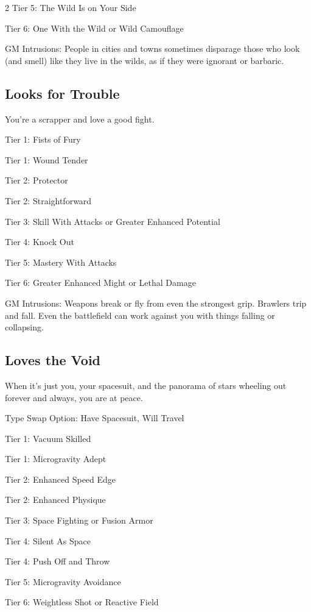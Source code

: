 \begin{multicols}{2}
Tier 5: The Wild Is on Your Side

Tier 6: One With the Wild or Wild Camouflage

GM Intrusions: People in cities and towns sometimes disparage those who look (and smell) like they live in the wilds, as if they were ignorant or barbaric.

\subsection{Looks for Trouble}

You’re a scrapper and love a good fight.

Tier 1: Fists of Fury

Tier 1: Wound Tender

Tier 2: Protector

Tier 2: Straightforward

Tier 3: Skill With Attacks or Greater Enhanced Potential

Tier 4: Knock Out

Tier 5: Mastery With Attacks

Tier 6: Greater Enhanced Might or Lethal Damage

GM Intrusions: Weapons break or fly from even the strongest grip. Brawlers trip and fall. Even the battlefield can work against you with things falling or collapsing.

\subsection{Loves the Void}

When it’s just you, your spacesuit, and the panorama of stars wheeling out forever and always, you are at peace.

Type Swap Option: Have Spacesuit, Will Travel

Tier 1: Vacuum Skilled

Tier 1: Microgravity Adept

Tier 2: Enhanced Speed Edge

Tier 2: Enhanced Physique

Tier 3: Space Fighting or Fusion Armor

Tier 4: Silent As Space

Tier 4: Push Off and Throw

Tier 5: Microgravity Avoidance

Tier 6: Weightless Shot or Reactive Field


\end{multicols}
